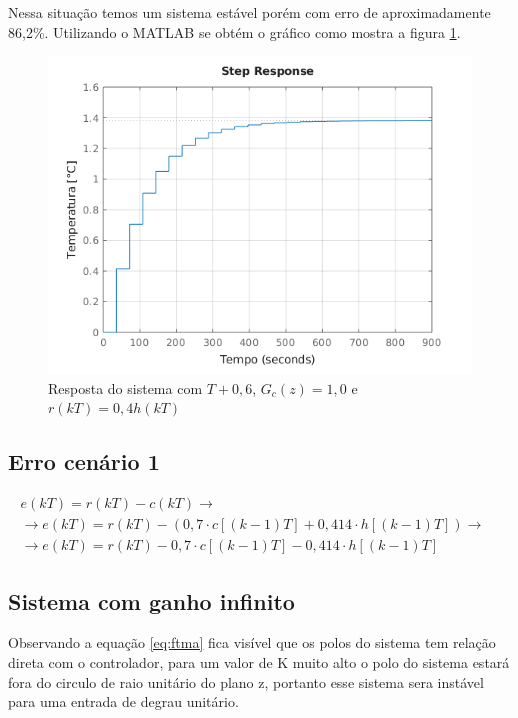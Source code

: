 \documentclass[a4paper,12pt]{article}
\begin{document}
			Nessa situação temos um sistema estável porém com erro de aproximadamente 86,2\%. Utilizando o MATLAB se obtém o gráfico como mostra a figura \ref{fig:resp_2_4}.
			

			\begin{figure}[H]
				\centering
				\includegraphics[width=0.6\linewidth]{images/resp2d.png}
				\caption{Resposta do sistema com $T+0,6$, $G_c(z)=1,0$ e $r(kT) = 0,4 h(kT)$}
				\label{fig:resp_2_4}
			\end{figure}
			
		\subsection{Erro cenário 1}
			
			\begin{equation}
				\left.
				\begin{array}{c}
					\displaystyle e(kT) = r(kT) - c(kT) \rightarrow \\[20pt]
					\displaystyle \rightarrow e(kT) = r(kT) - (0,7\cdot c[(k-1)T] + 0,414 \cdot h[(k-1)T]) \rightarrow \\[20pt]
					\displaystyle \rightarrow e(kT) = r(kT) - 0,7 \cdot c[(k-1)T] - 0,414\cdot h[(k-1)T]
				\end{array}
				\right.
				\quad 
			\end{equation}
			
		\subsection{Sistema com ganho infinito}
			Observando a equação \ref{eq:ftma} fica visível que os polos do sistema tem relação direta com o controlador, para um valor de K muito alto o polo do sistema estará fora do circulo de raio unitário do plano z, portanto esse sistema sera instável para uma entrada de degrau unitário.
		
\end{document}
